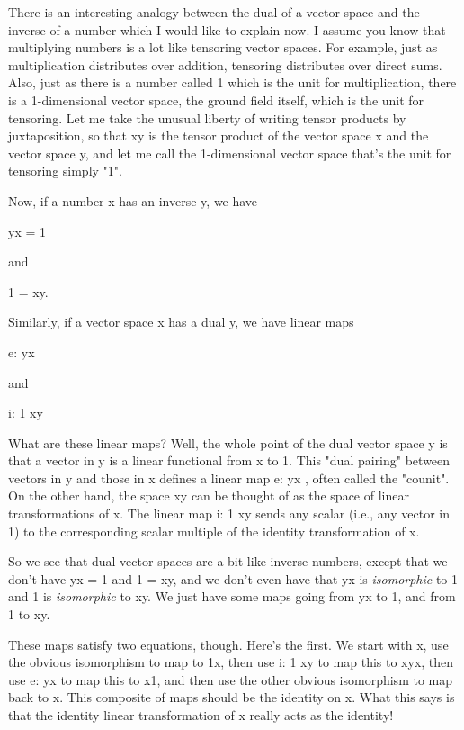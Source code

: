 There is an interesting analogy between the dual of a vector space and
the inverse of a number which I would like to explain now.  I assume you
know that multiplying numbers is a lot like tensoring vector spaces.
For example, just as multiplication distributes over addition, tensoring
distributes over direct sums.  Also, just as there is a number called 1
which is the unit for multiplication, there is a 1-dimensional vector
space, the ground field itself, which is the unit for tensoring.  Let me
take the unusual liberty of writing tensor products by juxtaposition, so
that xy is the tensor product of the vector space x and the vector space
y, and let me call the 1-dimensional vector space that's the unit for
tensoring simply "1".

Now, if a number x has an inverse y, we have

                     yx = 1

and 

                     1 = xy.

Similarly, if a vector space x has a dual y, we have linear maps

                     e: yx 

and

                     i: 1 \to  xy

What are these linear maps?  Well, the whole point of the dual vector
space y is that a vector in y is a linear functional from x to 1.
This "dual pairing" between vectors in y and those in x defines a
linear map e: yx , often called the "counit".  On the 
other hand,
the space xy can be thought of as the space of linear transformations of
x.  The linear map i: 1 \to  xy sends any scalar (i.e., any vector in 1)
to the corresponding scalar multiple of the identity transformation of
x.

So we see that dual vector spaces are a bit like inverse numbers, except
that we don't have yx = 1 and 1 = xy, and we don't even have that yx is
\emph{isomorphic} to 1 and 1 is \emph{isomorphic} 
to xy.  We just have some maps
going from yx to 1, and from 1 to xy.  

These maps satisfy two equations, though.  Here's the first.  We start
with x, use the obvious isomorphism to map to 1x, then use i: 1 \to  xy to
map this to xyx, then use e: yx  to map this to x1, and then use the
other obvious isomorphism to map back to x.  This composite of maps
should be the identity on x.  What this says is that the identity linear
transformation of x really acts as the identity!

